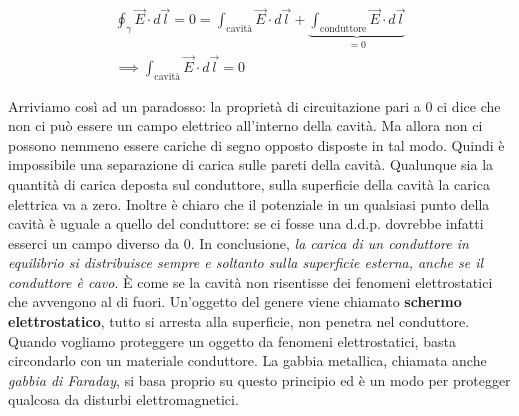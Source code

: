 \begin{gather*}
	\oint_{\gamma} \vec{E} \cdot d\vec{l} = 0 = \int_{\text{cavità}} \vec{E} \cdot d\vec{l}  + \underbrace{\int_{\text{conduttore}} \vec{E} \cdot d\vec{l}}_{=0} \\
	\implies \int_{\text{cavità}} \vec{E} \cdot d\vec{l} = 0
\end{gather*}

Arriviamo così ad un paradosso: la proprietà di circuitazione pari a $0$ ci dice che non ci può essere un campo elettrico all'interno della cavità. Ma allora non ci possono nemmeno essere cariche di segno opposto disposte in tal modo. Quindi è impossibile una separazione di carica sulle pareti della cavità. Qualunque sia la quantità di carica deposta sul conduttore, sulla superficie della cavità la carica elettrica va a zero. Inoltre è chiaro che il potenziale in un qualsiasi punto della cavità è uguale a quello del conduttore: se ci fosse una d.d.p. dovrebbe infatti esserci un campo diverso da $0$. In conclusione, \emph{la carica di un conduttore in equilibrio si distribuisce sempre e soltanto sulla superficie esterna, anche se il conduttore è cavo}.
È come se la cavità non risentisse dei fenomeni elettrostatici che avvengono al di fuori. Un'oggetto del genere viene chiamato \textbf{schermo elettrostatico}, tutto si arresta alla superficie, non penetra nel conduttore. Quando vogliamo proteggere un oggetto da fenomeni elettrostatici, basta circondarlo con un materiale conduttore. La gabbia metallica, chiamata anche \emph{gabbia di Faraday}, si basa proprio su questo principio ed è un modo per protegger qualcosa da disturbi elettromagnetici.

